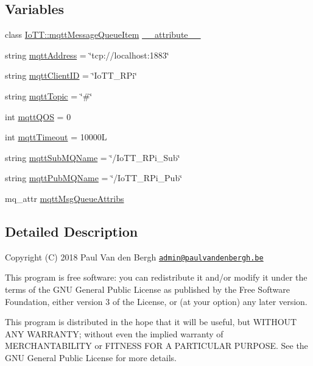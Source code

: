 \subsection*{Variables}
\begin{DoxyCompactItemize}
\item 
class \hyperlink{classIoTT_1_1mqttMessageQueueItem}{Io\+T\+T\+::mqtt\+Message\+Queue\+Item} \hyperlink{namespaceIoTT_a1c62efc2d4aa61fbde90116f24417451}{\+\_\+\+\_\+attribute\+\_\+\+\_\+}
\item 
string \hyperlink{namespaceIoTT_a6f663a1e0ebfb3cb6131a75a4c23b869}{mqtt\+Address} = \char`\"{}tcp\+://localhost\+:1883\char`\"{}
\item 
string \hyperlink{namespaceIoTT_a3ee57a41355a80e59b439e583629ad0e}{mqtt\+Client\+ID} = \char`\"{}Io\+T\+T\+\_\+\+R\+Pi\char`\"{}
\item 
string \hyperlink{namespaceIoTT_a9ef3190024e4c4c0836a889cc0040088}{mqtt\+Topic} = \char`\"{}\#\char`\"{}
\item 
int \hyperlink{namespaceIoTT_a6eef3057f162570da321fb6326812cc3}{mqtt\+Q\+OS} = 0
\item 
int \hyperlink{namespaceIoTT_ade85c73a3aca0a96a796510460591ed0}{mqtt\+Timeout} = 10000L
\item 
string \hyperlink{namespaceIoTT_a0ea5d152ba0545be67f096987c512b34}{mqtt\+Sub\+M\+Q\+Name} = \char`\"{}/Io\+T\+T\+\_\+\+R\+Pi\+\_\+\+Sub\char`\"{}
\item 
string \hyperlink{namespaceIoTT_a7f27a09048ef99545a72594635a3503b}{mqtt\+Pub\+M\+Q\+Name} = \char`\"{}/Io\+T\+T\+\_\+\+R\+Pi\+\_\+\+Pub\char`\"{}
\item 
mq\+\_\+attr \hyperlink{namespaceIoTT_a2a32f17de0792ea51b0fa9d6602ecf3f}{mqtt\+Msg\+Queue\+Attribs}
\end{DoxyCompactItemize}


\subsection{Detailed Description}
Copyright (C) 2018 Paul Van den Bergh \href{mailto:admin@paulvandenbergh.be}{\tt admin@paulvandenbergh.\+be}

This program is free software\+: you can redistribute it and/or modify it under the terms of the G\+NU General Public License as published by the Free Software Foundation, either version 3 of the License, or (at your option) any later version.

This program is distributed in the hope that it will be useful, but W\+I\+T\+H\+O\+UT A\+NY W\+A\+R\+R\+A\+N\+TY; without even the implied warranty of M\+E\+R\+C\+H\+A\+N\+T\+A\+B\+I\+L\+I\+TY or F\+I\+T\+N\+E\+SS F\+OR A P\+A\+R\+T\+I\+C\+U\+L\+AR P\+U\+R\+P\+O\+SE. See the G\+NU General Public License for more details.

